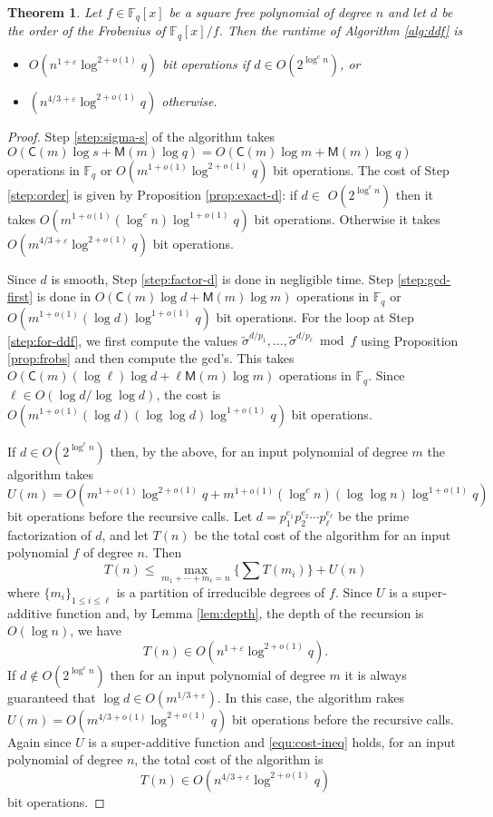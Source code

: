 \documentclass[12pt]{article}
\theoremstyle{plain}
\newtheorem{theorem}{Theorem}
\theoremstyle{definition}
\def\F{\ensuremath{\mathbb{F}}}
\def\MM{\ensuremath{\mathsf{M}}}
\def\CC{\ensuremath{\mathsf{C}}}
\begin{document}
\begin{theorem}\label{theo:main}
	Let $f \in \F_q[x]$ be a square free polynomial of degree $n$ and let $d$ be the order of the 
	Frobenius of $\F_q[x] / f$. Then the runtime of Algorithm \ref{alg:ddf} is
	\begin{itemize}
		\item $O(n^{1 + \varepsilon} \log^{2 + o(1)}q)$ bit operations if $d \in O(2^{\log^cn})$, or
		\item $(n^{4 / 3 + \varepsilon} \log^{2 + o(1)}q)$ otherwise.
	\end{itemize}
\end{theorem}
\begin{proof}
	Step \ref{step:sigma-s} of the algorithm takes $O(\CC(m)\log s + \MM(m)\log q) = O(\CC(m)\log m 
	+ \MM(m)\log q)$ operations in $\F_q$ or $O(m^{1 + o(1)}\log^{2 + o(1)}q)$ bit operations. The 
	cost of Step \ref{step:order} is given by Proposition \ref{prop:exact-d}: if $d \in $ 
	$O(2^{\log^cn})$ then it takes $O(m^{1 + o(1)} (\log^cn) \log^{1 + o(1)}q)$ bit operations. 
	Otherwise it takes $O(m^{4 / 3 + \varepsilon} \log^{2 + o(1)}q)$ bit operations. 
	
	Since $d$ is smooth, Step \ref{step:factor-d} is done in negligible time. Step 
	\ref{step:gcd-first} is done in $O(\CC(m)\log d + \MM(m)\log m)$ operations in $\F_q$ or 
	$O(m^{1 + o(1)}(\log d)\log^{1 + o(1)}q)$ bit operations. For the loop at Step 
	\ref{step:for-ddf}, we first compute the values $\tilde{\sigma}^{d / p_1}, \dots, 
	\tilde{\sigma}^{d / p_\ell} \bmod f$ using Proposition \ref{prop:frobs} and then compute the 
	gcd's. This takes $O(\CC(m)(\log \ell)\log d + \ell\MM(m)\log m)$ operations in $\F_q$. Since 
	$\ell \in O(\log d / \log\log d)$, the cost is $O(m^{1 + o(1)}(\log d)(\log \log d)\log^{1 + 
	o(1)}q)$ bit operations.
	
	If $d \in O(2^{\log^cn})$ then, by the above, for an input polynomial of degree $m$ the 
	algorithm takes 
	\[ U(m) = O(m^{1 + o(1)}\log^{2 + o(1)}q + m^{1 + o(1)}(\log^cn)(\log \log n)\log^{1 + o(1)}q) 
	\]
	bit operations before the recursive calls. Let $d = p_1^{e_1} p_2^{e_2} \cdots p_\ell^{e_\ell}$ 
	be the prime factorization of $d$, and let $T(n)$ be the total cost of the algorithm for an 
	input polynomial $f$ of degree $n$. Then
	\begin{equation}
	\label{equ:cost-ineq}
		T(n) \le \max_{m_1 + \cdots + m_\ell = n} \{ \sum T(m_i) \} + U(n)
	\end{equation}
	where $\{ m_i \}_{1 \le i \le \ell}$ is a partition of irreducible degrees of $f$. Since $U$ is 
	a super-additive function and, by Lemma \ref{lem:depth}, the depth of the recursion is $O(\log 
	n)$, we have
	\[ T(n) \in O(n^{1 + \varepsilon} \log^{2 + o(1)}q). \]
	If $d \notin O(2^{\log^cn})$ then for an input polynomial of degree $m$ it is always guaranteed 
	that $\log d \in O(m^{1 / 3 + \varepsilon})$. In this case, the algorithm rakes $U(m) = O(m^{4 / 3 + 
	o(1)} \log^{2 + o(1)}q)$ bit operations before the recursive calls. Again since $U$ is a 
	super-additive function and \eqref{equ:cost-ineq} holds, for an input polynomial of degree $n$, 
	the total cost of the algorithm is
	\[ T(n) \in O(n^{4 / 3 + \varepsilon} \log^{2 + o(1)}q) \]
	bit operations.
\end{proof}
\end{document}
